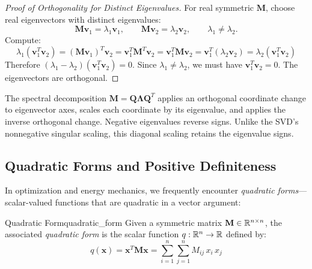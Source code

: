 \begin{proof}[Proof of Orthogonality for Distinct Eigenvalues]
For real symmetric $\mathbf M$, choose real eigenvectors with distinct eigenvalues:
\[
\mathbf M\mathbf v_1=\lambda_1\mathbf v_1,\qquad
\mathbf M\mathbf v_2=\lambda_2\mathbf v_2,\qquad\lambda_1\ne\lambda_2.
\]
Compute:
\begin{equation}
    \lambda_1 (\mathbf{v}_1^T \mathbf{v}_2) = (\mathbf{M}\mathbf{v}_1)^T \mathbf{v}_2 = \mathbf{v}_1^T \mathbf{M}^T \mathbf{v}_2 = \mathbf{v}_1^T \mathbf{M} \mathbf{v}_2 = \mathbf{v}_1^T (\lambda_2 \mathbf{v}_2) = \lambda_2 (\mathbf{v}_1^T \mathbf{v}_2)
\end{equation}
Therefore $(\lambda_1 - \lambda_2)(\mathbf{v}_1^T \mathbf{v}_2) = 0$. Since $\lambda_1 \neq \lambda_2$, we must have $\mathbf{v}_1^T \mathbf{v}_2 = 0$. The eigenvectors are orthogonal.
\end{proof}

The spectral decomposition $\mathbf M=\mathbf Q\boldsymbol\Lambda\mathbf Q^T$ applies an orthogonal coordinate change to eigenvector axes, scales each coordinate by its eigenvalue, and applies the inverse orthogonal change. Negative eigenvalues reverse signs. Unlike the SVD's nonnegative singular scaling, this diagonal scaling retains the eigenvalue signs.

\subsection{Quadratic Forms and Positive Definiteness}
\label{subsec:quadratic_forms}

In optimization and energy mechanics, we frequently encounter \emph{quadratic forms}---scalar-valued functions that are quadratic in a vector argument:

\begin{definition}{Quadratic Form}{quadratic_form}
Given a symmetric matrix $\mathbf{M} \in \mathbb{R}^{n \times n}$, the associated \emph{quadratic form} is the scalar function $q: \mathbb{R}^n \to \mathbb{R}$ defined by:
\begin{equation}
    q(\mathbf{x}) = \mathbf{x}^T \mathbf{M} \mathbf{x} = \sum_{i=1}^n \sum_{j=1}^n M_{ij} \, x_i \, x_j
\end{equation}
\end{definition}


